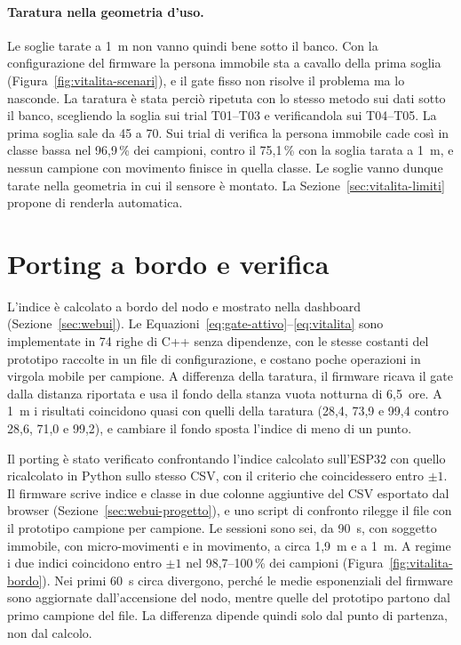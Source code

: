 \paragraph{Taratura nella geometria d'uso.} Le soglie tarate a 1~m non vanno quindi bene sotto il banco. Con la configurazione del firmware la persona immobile sta a cavallo della prima soglia (Figura~\ref{fig:vitalita-scenari}), e il gate fisso non risolve il problema ma lo nasconde. La taratura è stata perciò ripetuta con lo stesso metodo sui dati sotto il banco, scegliendo la soglia sui trial T01--T03 e verificandola sui T04--T05. La prima soglia sale da 45 a 70. Sui trial di verifica la persona immobile cade così in classe bassa nel 96,9\,\% dei campioni, contro il 75,1\,\% con la soglia tarata a 1~m, e nessun campione con movimento finisce in quella classe. Le soglie vanno dunque tarate nella geometria in cui il sensore è montato. La Sezione~\ref{sec:vitalita-limiti} propone di renderla automatica.

\section{Porting a bordo e verifica}
\label{sec:vitalita-bordo}

L'indice è calcolato a bordo del nodo e mostrato nella dashboard (Sezione~\ref{sec:webui}). Le Equazioni~\ref{eq:gate-attivo}--\ref{eq:vitalita} sono implementate in 74 righe di C++ senza dipendenze, con le stesse costanti del prototipo raccolte in un file di configurazione, e costano poche operazioni in virgola mobile per campione. A differenza della taratura, il firmware ricava il gate dalla distanza riportata e usa il fondo della stanza vuota notturna di 6,5~ore. A 1~m i risultati coincidono quasi con quelli della taratura (28,4, 73,9 e 99,4 contro 28,6, 71,0 e 99,2), e cambiare il fondo sposta l'indice di meno di un punto.

Il porting è stato verificato confrontando l'indice calcolato sull'ESP32 con quello ricalcolato in Python sullo stesso CSV, con il criterio che coincidessero entro $\pm 1$. Il firmware scrive indice e classe in due colonne aggiuntive del CSV esportato dal browser (Sezione~\ref{sec:webui-progetto}), e uno script di confronto rilegge il file con il prototipo campione per campione. Le sessioni sono sei, da 90~s, con soggetto immobile, con micro-movimenti e in movimento, a circa 1,9~m e a 1~m. A regime i due indici coincidono entro $\pm 1$ nel 98,7--100\,\% dei campioni (Figura~\ref{fig:vitalita-bordo}). Nei primi 60~s circa divergono, perché le medie esponenziali del firmware sono aggiornate dall'accensione del nodo, mentre quelle del prototipo partono dal primo campione del file. La differenza dipende quindi solo dal punto di partenza, non dal calcolo.

